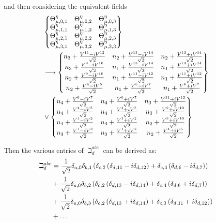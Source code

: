 and then considering the equivalent fields
\begin{align*}
   & \begin{Bmatrix}
       \Theta _{\mu,0,1}^{\eta} & \Theta _{\mu,0,2}^{\eta} & \Theta _{\mu,0,3}^{\eta} \\
       \Theta _{\mu,1,1}^{\eta} & \Theta _{\mu,1,2}^{\eta} & \Theta _{\mu,1,3}^{\eta} \\
       \Theta _{\mu,2,1}^{\eta} & \Theta _{\mu,2,2}^{\eta} & \Theta _{\mu,2,3}^{\eta} \\
       \Theta _{\mu,3,1}^{\eta} & \Theta _{\mu,3,2}^{\eta} & \Theta _{\mu,3,3}^{\eta}
     \end{Bmatrix} \\
   & \longrightarrow
  \begin{Bmatrix}
    n_{3} + \frac{V^{11}-iV^{12}}{\sqrt{2}} & n_{2} + \frac{V^{13}-iV^{14}}{\sqrt{2}} & n_{2} + \frac{V^{13}+iV^{14}}{\sqrt{2}} \\
    n_{3} + \frac{V^{9}-iV^{10}}{\sqrt{2}} & n_{1} + \frac{V^{13}-iV^{14}}{\sqrt{2}} & n_{1} + \frac{V^{13}+iV^{14}}{\sqrt{2}} \\
    n_{2} + \frac{V^{9}-iV^{10}}{\sqrt{2}} & n_{1} + \frac{V^{11}-iV^{12}}{\sqrt{2}} & n_{1} + \frac{V^{11}+iV^{12}}{\sqrt{2}} \\
    n_{2} + \frac{V^4-iV^5}{\sqrt{2}} & n_{1} + \frac{V^{6}-iV^{7}}{\sqrt{2}} & n_{1} + \frac{V^{6}+iV^{7}}{\sqrt{2}}
  \end{Bmatrix}                                  \\
   & \lor
  \begin{Bmatrix}
    n_{4} + \frac{V^{6}-iV^{7}}{\sqrt{2}} & n_{4} + \frac{V^{6}+iV^{7}}{\sqrt{2}} & n_{3} + \frac{V^{11}+iV^{12}}{\sqrt{2}} \\
    n_{4} + \frac{V^4-iV^5}{\sqrt{2}} & n_{4} + \frac{V^4+iV^5}{\sqrt{2}} & n_{3} + \frac{V^9+iV^{10}}{\sqrt{2}} \\
    n_{4} + \frac{V^1-iV^2}{\sqrt{2}} & n_{4} + \frac{V^1+iV^2}{\sqrt{2}} & n_{2} + \frac{V^9+iV^{10}}{\sqrt{2}} \\
    n_{3} + \frac{V^1-iV^2}{\sqrt{2}} & n_{3} + \frac{V^1+iV^2}{\sqrt{2}} & n_{2} + \frac{V^4+iV^5}{\sqrt{2}}
  \end{Bmatrix}
\end{align*}

Then the various entries of \(\beth^{a b c}_{d}\) can be derived as:
\begin{align*}
  \beth^{a b c}_{d}
   & = \frac{1}{\sqrt{2}}\delta_{a , 0}\delta_{b , 1}\left(
  \delta_{c , 3}\left(
    \delta_{d , 11} - i\delta_{d , 12}
    \right)+
  \delta_{c , 4}\left(
    \delta_{d , 6} - i\delta_{d , 7}
    \right)
  \right)                                    \\
   & + \frac{1}{\sqrt{2}}\delta_{a , 0}\delta_{b , 2}\left(
  \delta_{c , 2}\left(
    \delta_{d , 13} - i\delta_{d , 14}
    \right)+
  \delta_{c , 4}\left(
    \delta_{d , 6} + i\delta_{d , 7}
    \right)
  \right)                                    \\
   & + \frac{1}{\sqrt{2}}\delta_{a , 0}\delta_{b , 3}\left(
  \delta_{c , 2}\left(
    \delta_{d , 13} + i\delta_{d , 14}
    \right)+
  \delta_{c , 3}\left(
    \delta_{d , 11} + i\delta_{d , 12}
    \right)
  \right)                                    \\
   & + \ldots
\end{align*}


